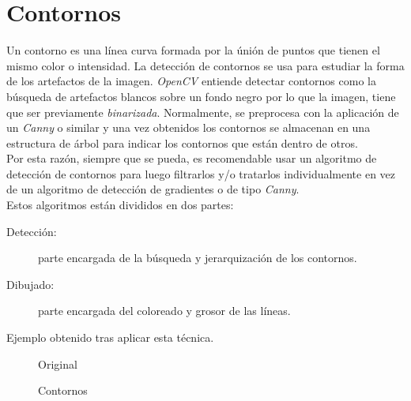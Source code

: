 \section{Contornos}\label{tecnica:contornos}
Un contorno es una línea curva formada por la únión de puntos que
tienen el mismo color o intensidad. La detección de contornos
\emph{\citep*[Contours in OpenCV]{opencv_tutorial-bib}}
\emph{\citep*[5.1 Edge Tracking]{toennies2012guide}}se usa para
estudiar la forma de los artefactos de la imagen. \emph{OpenCV}
entiende detectar contornos como la búsqueda de artefactos blancos
sobre un fondo negro por lo que la imagen, tiene que ser previamente
\emph{binarizada}. Normalmente, se preprocesa con la aplicación de un
\emph{Canny} o similar y una vez obtenidos los contornos se almacenan
en una estructura de árbol para indicar los contornos que están dentro
de otros. \\
Por esta razón, siempre que se pueda, es recomendable usar un
algoritmo de detección de contornos para luego filtrarlos y/o
tratarlos individualmente en vez de un algoritmo de detección de
gradientes o de tipo \emph{Canny}.\\
Estos algoritmos están divididos en dos partes:
\begin{description}
\item[Detección:] parte encargada de la búsqueda y jerarquización de
  los contornos.
\item[Dibujado:] parte encargada del coloreado y grosor de las líneas.
\end{description}

Ejemplo obtenido tras aplicar esta técnica.

\begin{figure}[H]
  \caption{Original}
  \centering \setlength\fboxsep{0pt} \setlength\fboxrule{0.5pt}
\end{figure}

\begin{figure}[H]
  \centering \setlength\fboxsep{0pt} \setlength\fboxrule{0.5pt}
  \caption{Contornos}
\end{figure}

